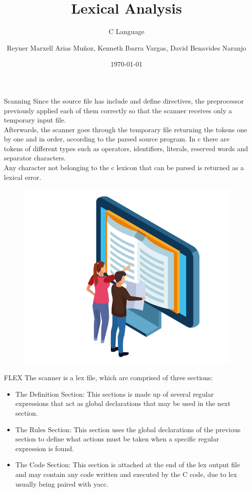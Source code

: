 \documentclass [xcolor=svgnames, t] {beamer}
\title[Lexical Analysis]{Lexical Analysis}
\subtitle{C Language}
\author[Project 1]{Reyner Marxell Arias Muñoz, Kenneth Ibarra Vargas, David Benavides Naranjo}
\institute[]{Project 1, Compilers and Interpreters course, I 2022 Semester}
\date{\today}
\begin{document}
\begin{frame}
\maketitle
\end{frame}

\begin{frame}{Scanning}
Since the source file has include and define directives, the preprocessor previously applied each of them correctly so that the scanner receives only a temporary input file.
\\Afterwards, the scanner goes through the temporary file returning the tokens one by one and in order, according to the parsed source program. In c there are tokens of different types such as operators, identifiers, literals, reserved words and separator characters.
\\Any character not belonging to the c lexicon that can be parsed is returned as a lexical error.\\
\begin{figure}
\centering
\includegraphics[scale = 0.14]{Scanner.png}
\end{figure}
\end{frame}

\begin{frame}{FLEX}
The scanner is a lex file, which are comprised of three sections:
\begin{itemize}
\item The Definition Section: This sections is made up of several regular expressions that act as global declarations that may be used in the next section.
\item The Rules Section: This section uses the global declarations of the previous section to define what actions must be taken when a specific regular expression is found.
\item The Code Section: This section is attached at the end of the lex output file and may contain any code written and executed by the C code, due to lex usually being paired with yacc. \\
\end{itemize}
\end{frame}
\end{document}
